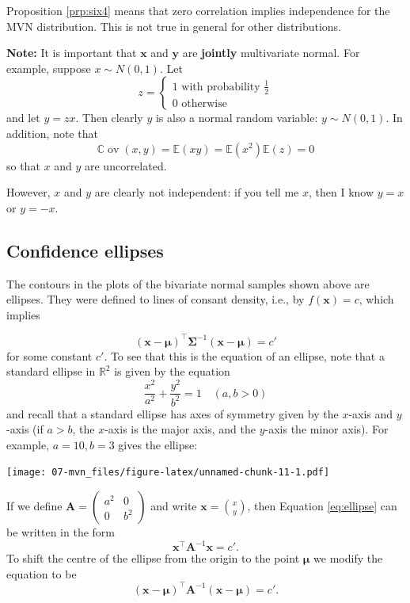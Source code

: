 \documentclass[]{book}
\theoremstyle{definition}
\theoremstyle{definition}
\theoremstyle{definition}
\theoremstyle{remark}
\begin{document}
Proposition \ref{prp:six4} means that zero correlation implies independence for the MVN distribution. This is not true in general for other distributions.

\textbf{Note:} It is important that \(\mathbf x\) and \(\mathbf y\) are \textbf{jointly} multivariate normal. For example, suppose \(x \sim N(0, 1)\). Let
\[z=\begin{cases}
1 \mbox{ with probability } \frac{1}{2}\\
0 \mbox{ otherwise}
\end{cases}
\]
and let \(y=zx\). Then clearly \(y\) is also a normal random variable: \(y \sim N(0,1)\). In addition, note that
\[{\mathbb{C}\operatorname{ov}}(x,y)= {\mathbb{E}}(xy)= {\mathbb{E}}(x^2){\mathbb{E}}(z)=0\]
so that \(x\) and \(y\) are uncorrelated.

However, \(x\) and \(y\) are clearly not independent: if you tell me \(x\), then I know \(y=x\) or \(y=-x\).

\hypertarget{confidence-ellipses}{%
\subsection{Confidence ellipses}\label{confidence-ellipses}}

The contours in the plots of the bivariate normal samples shown above are ellipses.
They were defined to lines of consant density, i.e., by \(f(\mathbf x)=c\), which implies

\begin{equation}
(\mathbf x- {\boldsymbol{\mu}})^\top \boldsymbol{\Sigma}^{-1} (\mathbf x- {\boldsymbol{\mu}})=c' \label{eq:mvnellipse}
\end{equation}
for some constant \(c'\).
To see that this is the equation of an ellipse, note that a standard ellipse in \(\mathbb{R}^2\) is given by the equation
\begin{equation}
\frac{x^2}{a^2}+\frac{y^2}{b^2}=1 \quad (a, b>0) \label{eq:ellipse}
\end{equation}
and recall that a standard ellipse has axes of symmetry given by the \(x\)-axis and \(y\)-axis
(if \(a>b\), the \(x\)-axis is the major axis, and the \(y\)-axis the minor axis). For example, \(a=10, b=3\) gives the ellipse:

\texttt{[image: 07-mvn\_files/figure-latex/unnamed-chunk-11-1.pdf]}

If we define
\({\mathbf A}=\left( \begin{array}{cc} a^2&0\\ 0&b^2 \end{array} \right)\) and write \({\mathbf x}=\binom{x}{y}\),
then Equation \eqref{eq:ellipse} can be written in the form
\[ \mathbf x^\top {\mathbf A}^{-1}\mathbf x=c'. \]
To shift the centre of the ellipse from the origin to the point \({\boldsymbol{\mu}}\) we modify the equation to be
\[ (\mathbf x-{\boldsymbol{\mu}})^\top {\mathbf A}^{-1}(\mathbf x-{\boldsymbol{\mu}}) =c'.\]
\end{document}
